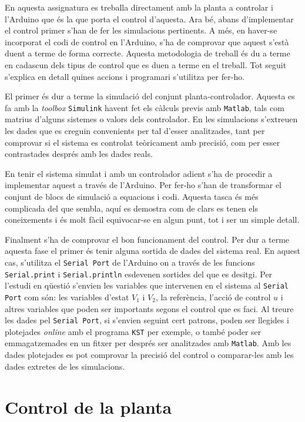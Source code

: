 \documentclass[12pt,a4paper,final,twoside,openright]{report}
\begin{document}
En aquesta assignatura es treballa directament amb la planta a controlar i l'Arduino que és la que porta el control d'aquesta. Ara bé, abans d'implementar el control primer s'han de fer les simulacions pertinents. A més, en haver-se incorporat el codi de control en l'Arduino, s'ha de comprovar que aquest s'està duent a terme de forma correcte. Aquesta metodologia de treball és du a terme en cadascun dels tipus de control que es duen a terme en el treball. Tot seguit s'explica en detall quines accions i programari s'utilitza per fer-ho.

El primer és dur a terme la simulació del conjunt planta-controlador. Aquesta es fa amb la \textit{toolbox} \texttt{Simulink} havent fet els càlculs previs amb \texttt{Matlab}, tals com matrius d'alguns sistemes o valors dels controlador. En les simulacions s'extreuen les dades que es creguin convenients per tal d'esser analitzades, tant per comprovar si el sistema es controlat teòricament amb precisió, com per esser contrastades després amb les dades reals.

En tenir el sistema simulat i amb un controlador adient s'ha de procedir a implementar aquest a través de l'Arduino. Per fer-ho s'han de transformar el conjunt de blocs de simulació a equacions i codi. Aquesta tasca és més complicada del que sembla, aquí es demostra com de clars es tenen els coneixements i és molt fàcil equivocar-se en algun punt, tot i ser un simple detall.

Finalment s'ha de comprovar el bon funcionament del control. Per dur a terme aquesta fase el primer és tenir alguna sortida de dades del sistema real. En aquest cas, s'utilitza el \texttt{Serial Port} de l'Arduino on a través de les funcions \texttt{Serial.print} i \texttt{Serial.println} esdevenen sortides del que es desitgi. Per l'estudi en qüestió s'envien les variables que intervenen en el sistema al \texttt{Serial Port} com són: les variables d'estat $V_1$ i $V_2$, la referència, l'acció de control $u$ i altres variables que poden ser importants segons el control que es faci. Al treure les dades pel \texttt{Serial Port}, si s'envien seguint cert patrons, poden ser llegides i plotejades \textit{online} amb el programa \texttt{KST} per exemple, o també poder ser emmagatzemades en un fitxer per després ser analitzades amb \texttt{Matlab}. Amb les dades plotejades es pot comprovar la precisió del control o comparar-les amb les dades extretes de les simulacions.

\chapter{Control de la planta}
\end{document}
